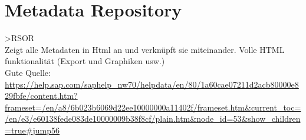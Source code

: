 \chapter{Metadata Repository}
>RSOR\\
Zeigt alle Metadaten in Html an und verknüpft sie miteinander. Volle HTML funktionalität (Export und Graphiken usw.)\\

Gute Quelle:
\url{https://help.sap.com/saphelp_nw70/helpdata/en/80/1a60cae07211d2acb80000e829fbfe/content.htm?frameset=/en/a8/6b023b6069d22ee10000000a11402f/frameset.htm&current_toc=/en/e3/e60138fede083de10000009b38f8cf/plain.htm&node_id=53&show_children=true#jump56}

